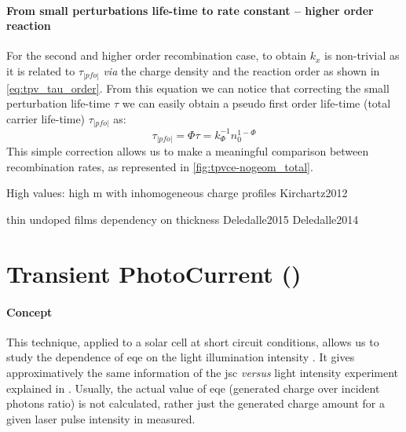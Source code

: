 \paragraph{From small perturbations life-time to rate constant -- higher order reaction}
For the second and higher order recombination case, to obtain $k_x$ is non-trivial as it is related to $\tau_|pfo|$ \textit{via} the charge density \cite{ORegan2007} and the reaction order \cite{Shuttle2008,Du2018,Barnes2011,Barnes2011a} as shown in \cref{eq:tpv_tau_order}.
From this equation we can notice that correcting the small perturbation life-time $\tau$ we can easily obtain a pseudo first order life-time (total carrier life-time) $\tau_|pfo|$ as:
$$\tau_|pfo| = \Phi \tau = k_\Phi^{-1} n_0^{1-\Phi}$$
This simple correction allows us to make a meaningful comparison between recombination rates, as represented in \cref{fig:tpvce-nogeom_total}.

High values: high m with inhomogeneous charge profiles Kirchartz2012

thin undoped films dependency on thickness Deledalle2015 Deledalle2014

\section{Transient PhotoCurrent ()}\label{characterization_tpc}

	\paragraph{Concept}
	This technique, applied to a solar cell at short circuit conditions, allows us to study the dependence of \gls{eqe} on the light illumination intensity \cite{ORegan2004}.
	It gives approximatively the same information of the \gls{jsc} \textit{versus} light intensity experiment explained in .
	Usually, the actual value of \gls{eqe} (generated charge over incident photons ratio) is not calculated, rather just the generated charge amount for a given laser pulse intensity in measured.

